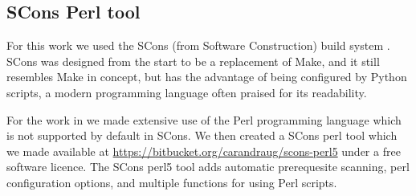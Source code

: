 \subsection{SCons Perl tool}

For this work we used the SCons (from Software Construction) build
system \citep{scons}.  SCons was designed from the start to be a
replacement of Make, and it still resembles Make in concept, but has
the advantage of being configured by Python scripts, a modern
programming language often praised for its readability.


For the work in  we made extensive use of
the Perl programming language which is not supported by default in
SCons.  We then created a SCons perl tool which we made available at
\url{https://bitbucket.org/carandraug/scons-perl5} under a free
software licence.  The SCons perl5 tool adds automatic prerequesite
scanning, perl configuration options, and multiple functions for using
Perl scripts.

